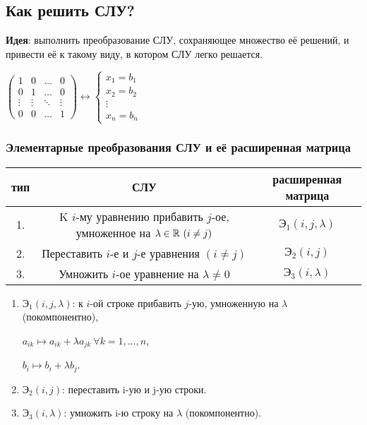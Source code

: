 \subsection{Как решить СЛУ?}

\textbf{Идея}: выполнить преобразование СЛУ, сохраняющее множество её решений, и привести её к такому виду, в котором СЛУ легко решается.

\begin{example}
    $\begin{pmatrix}
        1 & 0 & \dots & 0 \\
        0 & 1 & \dots & 0 \\
        \vdots & \vdots & \ddots & \vdots \\
        0 & 0 & \dots & 1
    \end{pmatrix} \leftrightarrow \begin{cases}
        x_1 = b_1 \\
        x_2 = b_2 \\ 
        \vdots \\ 
        x_n = b_n
    \end{cases}$
\end{example}

\subsubsection{Элементарные преобразования СЛУ и её расширенная матрица}

\begin{tabular}{c|c|c}
    тип & СЛУ & расширенная матрица \\
    \hline
    1. & K $i$-му уравнению прибавить $j$-ое, умноженное на $\lambda \in \mathbb{R} \ (i \neq j)$ & $\text{Э}_1(i, j, \lambda)$ \\
    2. & Переставить $i$-е и $j$-е уравнения $(i \neq j)$ & $\text{Э}_2(i, j)$ \\
    3. & Умножить $i$-ое уравнение на $\lambda \neq 0$ & $\text{Э}_3(i, \lambda)$
\end{tabular}

\begin{enumerate}
\item
    $\text{Э}_1(i, j, \lambda)$: к $i$-ой строке прибавить $j$-ую, умноженную на $\lambda$ (покомпонентно), 

    $a_{ik} \mapsto a_{ik} + \lambda a_{jk} \ \forall k = 1, \dots, n$,
    
    $b_i \mapsto b_i + \lambda b_j$.
    
\item
    $\text{Э}_2(i, j)$: переставить i-ую и j-ую строки.

\item
    $\text{Э}_3(i, \lambda)$: умножить i-ю строку на $\lambda$ (покомпонентно).
\end{enumerate}

